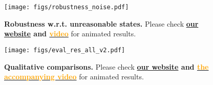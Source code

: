 \begin{figure}[ht]
  \centering
  \vspace{-10pt}
  \texttt{[image: figs/robustness\_noise.pdf]}
  \vspace{-20pt}
  \caption{\footnotesize
  \textbf{Robustness w.r.t. unreasonable states. }
  Please check \textbf{\href{https://projectwebsite7.github.io/gene-dex-manip/}{our website} and {\href{https://projectwebsite7.github.io/gene-dex-manip/static/videos-lowres/video_7.mp4}{\textcolor{orange}{video}}}} for animated results.
  }
  \label{fig_res_robustness}
  \vspace{-10pt}
\end{figure}


\begin{figure}[ht]
  \centering
  \texttt{[image: figs/eval\_res\_all\_v2.pdf]}
  \caption{\footnotesize
  \textbf{Qualitative comparisons. }
  Please check \textbf{\href{https://projectwebsite7.github.io/gene-dex-manip/}{our website} and {\href{https://projectwebsite7.github.io/gene-dex-manip/static/videos-lowres/video_7.mp4}{\textcolor{orange}{the accompanying video}}}} for animated results.
  }
  \label{fig_res}
  \vspace{-10pt}
\end{figure}





